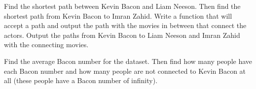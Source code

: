 \begin{problem}
Find the shortest path between Kevin Bacon and Liam Neeson. Then find the shortest path from Kevin Bacon to Imran Zahid. Write a function that will accept a path and output the path with the movies in between that connect the actors. Output the paths from Kevin Bacon to Liam Neeson and Imran Zahid with the connecting movies.
\end{problem}

\begin{problem}
Find the average Bacon number for the dataset. Then find how many people have each Bacon number and how many people are not connected to Kevin Bacon at all (these people have a Bacon number of infinity).
\end{problem}

